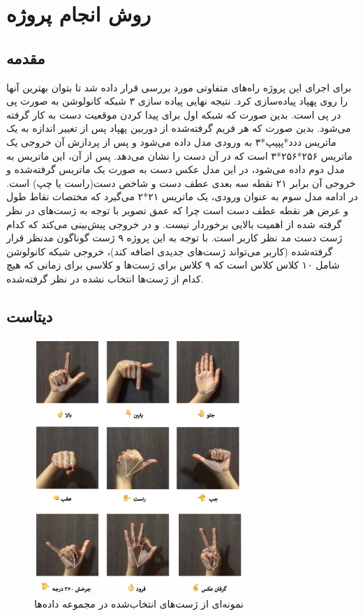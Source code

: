 \chapter{روش انجام پروژه}
\section{مقدمه}

برای اجرای این پروژه راه‌های متفاوتی مورد بررسی قرار داده شد تا بتوان بهترین آنها را روی پهپاد پیاده‌سازی کرد. نتیجه نهایی پیاده سازی ۳ شبکه کانولوشن
به صورت پی در پی است. بدین صورت که شبکه اول برای پیدا کردن موقعیت دست به کار گرفته می‌شود. بدین صورت که هر فریم گرفته‌شده از دوربین پهپاد 
پس از تغییر اندازه به یک ماتریس ددد*پپپپ*۳ به ورودی مدل داده می‌شود و پس از پردازش آن خروجی یک ماتریس ۲۵۶*۲۵۶*۳ است که در 
آن دست را نشان می‌دهد. پس از آن، این ماتریس به مدل دوم داده می‌شود، در این مدل عکس دست به صورت یک ماتریس گرفته‌شده و خروجی آن برابر ۲۱ نقطه 
سه بعدی عطف دست و شاخص دست(راست یا چپ) است.  در ادامه مدل سوم به عنوان ورودی، یک ماتریس ۲۱*۲ می‌گیرد که مختصات نقاط  طول و عرض هر نقطه عطف دست است 
چرا که عمق تصویر با توجه به ژست‌های در نظر گرفته شده از اهمیت بالایی برخوردار نیست. و در خروجی پیش‌بینی می‌کند که کدام ژست دست مد نظر کاربر است. با توجه به این پروژه ۹ ژست 
گوناگون مدنظر قرار گرفته‌شده (کاربر می‌تواند ژست‌های جدیدی اضافه کند)، خروجی شبکه کانولوشن شامل ۱۰ کلاس 
کلاس است که ۹ کلاس برای ژست‌ها و کلاسی برای زمانی که هیچ کدام از ژست‌ها انتخاب نشده در نظر گرفته‌شده.


\section{دیتاست}

\begin{figure}[h]
    \centering
    \includegraphics[width=0.7\textwidth]{gestures.png}
    \caption{نمونه‌ای از ژست‌های انتخاب‌شده در مجموعه داده‌ها}
\end{figure}


